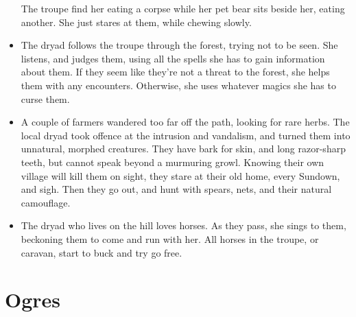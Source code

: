 \begin{multicols}{2}
\begin{itemize}
  The troupe find her eating a corpse while her pet bear sits beside her, eating another.
  She just stares at them, while chewing slowly.
  \item
  The dryad follows the troupe through the forest, trying not to be seen.
  She listens, and judges them, using all the spells she has to gain information about them.
  If they seem like they're not a threat to the forest, she helps them with any encounters.
  Otherwise, she uses whatever magics she has to curse them.
  \item
  A couple of farmers wandered too far off the path, looking for rare herbs.
  The local dryad took offence at the intrusion and vandalism, and turned them into unnatural, morphed creatures.
  They have bark for skin, and long razor-sharp teeth, but cannot speak beyond a murmuring growl.
  Knowing their own \gls{village} will kill them on sight, they stare at their old home, every Sundown, and sigh.
  Then they go out, and hunt with spears, nets, and their natural camouflage.
  \item
  The dryad who lives on the hill loves horses.
  As they pass, she sings to them, beckoning them to come and run with her.
  All horses in the troupe, or caravan, start to buck and try go free.
\end{itemize}

\end{multicols}

\needspace{19em}
\section[Ogre]{Ogres}
\label{ogre}


